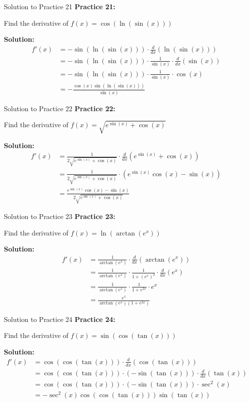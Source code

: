 \documentclass[aspectratio=169]{beamer}
\begin{document}
\begin{frame}{Solution to Practice 21}
\textbf{Practice 21:}

Find the derivative of $f(x) = \cos(\ln(\sin(x)))$

\textbf{Solution:}
\[
\begin{aligned}
  f'(x) &= -\sin(\ln(\sin(x))) \cdot \frac{d}{dx}(\ln(\sin(x))) \\
  &= -\sin(\ln(\sin(x))) \cdot \frac{1}{\sin(x)} \cdot \frac{d}{dx}(\sin(x)) \\
  &= -\sin(\ln(\sin(x))) \cdot \frac{1}{\sin(x)} \cdot \cos(x) \\
  &= -\frac{\cos(x)\sin(\ln(\sin(x)))}{\sin(x)}
\end{aligned}
\]
\end{frame}

\begin{frame}{Solution to Practice 22}
\textbf{Practice 22:}

Find the derivative of $f(x) = \sqrt{e^{\sin(x)} + \cos(x)}$

\textbf{Solution:}
\[
\begin{aligned}
  f'(x) &= \frac{1}{2\sqrt{e^{\sin(x)} + \cos(x)}} \cdot \frac{d}{dx}(e^{\sin(x)} + \cos(x)) \\
  &= \frac{1}{2\sqrt{e^{\sin(x)} + \cos(x)}} \cdot (e^{\sin(x)}\cos(x) - \sin(x)) \\
  &= \frac{e^{\sin(x)}\cos(x) - \sin(x)}{2\sqrt{e^{\sin(x)} + \cos(x)}}
\end{aligned}
\]
\end{frame}

\begin{frame}{Solution to Practice 23}
\textbf{Practice 23:}

Find the derivative of $f(x) = \ln(\arctan(e^x))$

\textbf{Solution:}
\[
\begin{aligned}
  f'(x) &= \frac{1}{\arctan(e^x)} \cdot \frac{d}{dx}(\arctan(e^x)) \\
  &= \frac{1}{\arctan(e^x)} \cdot \frac{1}{1 + (e^x)^2} \cdot \frac{d}{dx}(e^x) \\
  &= \frac{1}{\arctan(e^x)} \cdot \frac{1}{1 + e^{2x}} \cdot e^x \\
  &= \frac{e^x}{\arctan(e^x)(1 + e^{2x})}
\end{aligned}
\]
\end{frame}

\begin{frame}{Solution to Practice 24}
\textbf{Practice 24:}

Find the derivative of $f(x) = \sin(\cos(\tan(x)))$

\textbf{Solution:}
\[
\begin{aligned}
  f'(x) &= \cos(\cos(\tan(x))) \cdot \frac{d}{dx}(\cos(\tan(x))) \\
  &= \cos(\cos(\tan(x))) \cdot (-\sin(\tan(x))) \cdot \frac{d}{dx}(\tan(x)) \\
  &= \cos(\cos(\tan(x))) \cdot (-\sin(\tan(x))) \cdot \sec^2(x) \\
  &= -\sec^2(x)\cos(\cos(\tan(x)))\sin(\tan(x))
\end{aligned}
\]
\end{frame}
\end{document}
